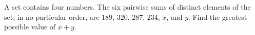 A set contains four numbers. The six pairwise sums of distinct elements of the set, in no particular order, are $189$, $320$, $287$, $234$, $x$, and $y$. Find the greatest possible value of $x+y$.